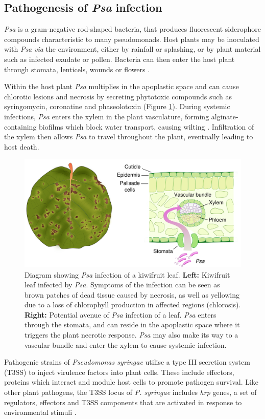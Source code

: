 \subsection{Pathogenesis of \textit{Psa} infection}
\textit{Psa} is a gram-negative rod-shaped bacteria, that produces fluorescent siderophore compounds characteristic to many pseudomonads. Host plants may be inoculated with \textit{Psa} \textit{via} the environment, either by rainfall or splashing, or by plant material such as infected exudate or pollen. Bacteria can then enter the host plant through stomata, lenticels, wounds or flowers \citep{Donati2018-fe,Spinelli2011-uk,Donati2014-wy}.\par Within the host plant \textit{Psa} multiplies in the apoplastic space and can cause chlorotic lesions and necrosis by secreting phytotoxic compounds such as syringomycin, coronatine and phaseolotoxin (Figure \ref{fig:psa_infection}). During systemic infections, \textit{Psa} enters the xylem in the plant vasculature, forming alginate-containing biofilms which block water transport, causing wilting \citep{Bae2015-zq}. Infiltration of the xylem then allows \textit{Psa} to travel throughout the plant, eventually leading to host death.
\begin{figure}[H]
  \includegraphics[scale=0.8]{psa/psa_infection.png}
  \centering
  \caption[Diagram showing \textit{Psa} infection of a kiwifruit leaf]{Diagram showing \textit{Psa} infection of a kiwifruit leaf. \textbf{Left:} Kiwifruit leaf infected by \textit{Psa}. Symptoms of the infection can be seen as brown patches of dead tissue caused by necrosis, as well as yellowing due to a loss of chlorophyll production in affected regions (chlorosis). \textbf{Right:} Potential avenue of \textit{Psa} infection of a leaf. \textit{Psa} enters through the stomata, and can reside in the apoplastic space where it triggers the plant necrotic response. \textit{Psa} may also make its way to a vascular bundle and enter the xylem to cause systemic infection.}
  \label{fig:psa_infection}
\end{figure}
Pathogenic strains of \textit{Pseudomonas syringae} utilise a type III secretion system (T3SS) to inject virulence factors into plant cells. These include effectors, proteins which interact and module host cells to promote pathogen survival. Like other plant pathogens, the T3SS locus of \textit{P. syringae} includes \textit{hrp} genes, a set of regulators, effectors and T3SS components that are activated in response to environmental stimuli \citep{Lindgren2003-ch}.

